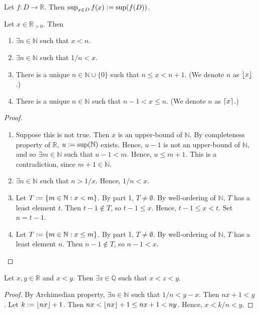 \documentclass[a4paper, 12pt, fleqn]{article}
\begin{document}
\begin{definition}
Let $f: D \to \mathbb{R}$. Then $\sup_{x \in D} f(x) := \sup(f(D))$.
\end{definition}

\begin{lemma}
Let $x \in \mathbb{R}_{> 0}$. Then
\begin{enumerate}
\item $\exists n \in \mathbb{N}$ such that $x < n$.
\item $\exists n \in \mathbb{N}$ such that $1/n < x$.
\item There is a unique $n \in \mathbb{N} \cup \{0\}$ such that $n \le x < n+1$.
    (We denote $n$ as $\lfloor x \rfloor$.)
\item There is a unique $n \in \mathbb{N}$ such that $n-1 < x \le n$.
    (We denote $n$ as $\lceil x \rceil$.)
\end{enumerate}
\end{lemma}
\begin{proof}
\begin{enumerate}
\item Suppose this is not true. Then $x$ is an upper-bound of $\mathbb{N}$.
    By completeness property of $\mathbb{R}$, $u := \sup(\mathbb{N})$ exists.
    Hence, $u-1$ is not an upper-bound of $\mathbb{N}$, and so $\exists m \in \mathbb{N}$
    such that $u-1 < m$. Hence, $u \le m+1$. This is a contradiction, since $m+1 \in \mathbb{N}$.
\item $\exists n \in \mathbb{N}$ such that $n > 1/x$. Hence, $1/n < x$.
\item Let $T := \{m \in \mathbb{N}: x < m\}$. By part 1, $T \neq \emptyset$.
    By well-ordering of $\mathbb{N}$, $T$ has a least element $t$.
    Then $t-1 \not\in T$, so $t-1 \le x$. Hence, $t-1 \le x < t$. Set $n = t-1$.
\item Let $T := \{m \in \mathbb{N}: x \le m\}$. By part 1, $T \neq \emptyset$.
    By well-ordering of $\mathbb{N}$, $T$ has a least element $n$.
    Then $n-1 \not\in T$, so $n-1 < x$.
\end{enumerate}
\end{proof}

\begin{lemma}
Let $x, y \in \mathbb{R}$ and $x < y$. Then $\exists z \in \mathbb{Q}$ such that $x < z < y$.
\end{lemma}
\begin{proof}
By Archimedian property, $\exists n \in \mathbb{N}$ such that $1/n < y-x$. Then $nx + 1 < y$.
Let $k := \left\lfloor nx \right\rfloor+1$. Then $nx < \left\lfloor nx \right\rfloor + 1 \le nx + 1 < ny$.
Hence, $x < k/n < y$.
\end{proof}
\end{document}

